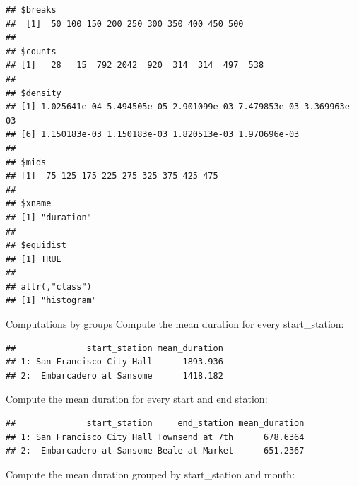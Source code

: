 \documentclass[]{book}
\newenvironment{Shaded}{\begin{snugshade}}{\end{snugshade}}
\newcommand{\DataTypeTok}[1]{\textcolor[rgb]{0.13,0.29,0.53}{#1}}
\newcommand{\DecValTok}[1]{\textcolor[rgb]{0.00,0.00,0.81}{#1}}
\newcommand{\KeywordTok}[1]{\textcolor[rgb]{0.13,0.29,0.53}{\textbf{#1}}}
\newcommand{\NormalTok}[1]{#1}
\newcommand{\OperatorTok}[1]{\textcolor[rgb]{0.81,0.36,0.00}{\textbf{#1}}}
\newcommand{\StringTok}[1]{\textcolor[rgb]{0.31,0.60,0.02}{#1}}
\begin{document}
\begin{verbatim}
## $breaks
##  [1]  50 100 150 200 250 300 350 400 450 500
## 
## $counts
## [1]   28   15  792 2042  920  314  314  497  538
## 
## $density
## [1] 1.025641e-04 5.494505e-05 2.901099e-03 7.479853e-03 3.369963e-03
## [6] 1.150183e-03 1.150183e-03 1.820513e-03 1.970696e-03
## 
## $mids
## [1]  75 125 175 225 275 325 375 425 475
## 
## $xname
## [1] "duration"
## 
## $equidist
## [1] TRUE
## 
## attr(,"class")
## [1] "histogram"
\end{verbatim}

Computations by groups
Compute the mean duration for every start\_station:

\begin{Shaded}
\end{Shaded}

\begin{verbatim}
##              start_station mean_duration
## 1: San Francisco City Hall      1893.936
## 2:  Embarcadero at Sansome      1418.182
\end{verbatim}

Compute the mean duration for every start and end station:

\begin{Shaded}
\end{Shaded}

\begin{verbatim}
##              start_station     end_station mean_duration
## 1: San Francisco City Hall Townsend at 7th      678.6364
## 2:  Embarcadero at Sansome Beale at Market      651.2367
\end{verbatim}

Compute the mean duration grouped by start\_station and month:
\end{document}
